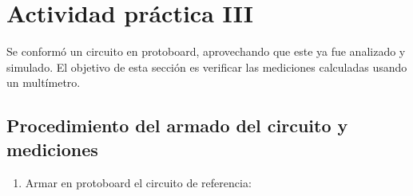 \noindent
\section{Actividad práctica III} \sangria{} Se conformó un circuito en protoboard, aprovechando que este ya fue analizado y simulado. El objetivo de esta sección es verificar las mediciones calculadas usando un multímetro.
\subsection{Procedimiento del armado del circuito y mediciones}
\begin{enumerate} 
    \item Armar en protoboard el circuito de referencia:

          
          





\end{enumerate}
